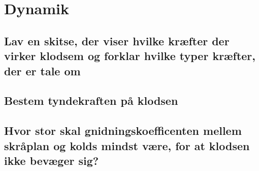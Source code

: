 \newpage
\section{Dynamik}
\subsection{Lav en skitse, der viser hvilke kræfter der virker klodsem og forklar hvilke typer kræfter, der er tale om}

\subsection{Bestem tyndekraften på klodsen}

\subsection{Hvor stor skal gnidningskoefficenten mellem skråplan og kolds mindst være, for at klodsen ikke bevæger sig?}
